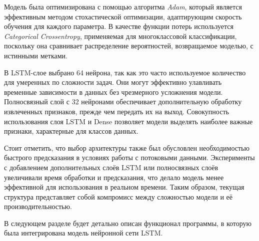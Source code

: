 \documentclass[spec, och, diploma]{SCWorks}
\begin{document}
Модель была оптимизирована с помощью алгоритма \textit{Adam}, который является эффективным методом стохастической оптимизации, адаптирующим скорость 
обучения для каждого параметра. В качестве функции потерь используется \textit{Categorical Crossentropy}, применяемая для многоклассовой классификации, 
поскольку она сравнивает распределение вероятностей, возвращаемое моделью, с истинными метками.

В LSTM-слое выбрано 64 нейрона, так как это часто используемое количество для умеренных по сложности задач. Они могут эффективно улавливать 
временные зависимости в данных без чрезмерного усложнения модели. Полносвязный слой с 32 нейронами обеспечивает дополнительную обработку извлеченных 
признаков, прежде чем передать их на выход. Совокупность использования слоя LSTM и Dense 
позволяет модели выделять наиболее важные признаки, характерные для классов данных. 

Стоит отметить, что выбор архитектуры также был обусловлен необходимостью быстрого предсказания в условиях работы с потоковыми данными. Эксперименты с 
добавлением дополнительных слоёв LSTM или полносвязных слоёв увеличивали время обработки и предсказания, что делало модель менее эффективной для 
использования в реальном времени. Таким образом, текущая структура представляет собой компромисс между сложностью модели и её производительностью.

В следующем разделе будет детально описан функционал программы, в которую была интегрирована модель нейронной сети LSTM. 
  



  
\end{document}
